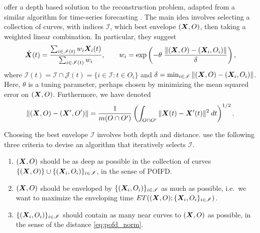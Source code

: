 \textcite{elias-jimenez-shang-2023} offer a depth based solution
to the reconstruction problem, adapted from a similar algorithm for
time-series forecasting \parencite{elias-jimenez-shang-2022}.
The main idea involves selecting a collection of curves, with indices
$\mathscr{I}$, which best envelope $(\bm{X}, O)$, then taking a weighted linear
combination.
In particular, they suggest
\begin{equation}
    \hat{\bm{X}}(t) = \frac{\sum_{i \in \mathscr{I}(t)} w_i \bm{X}_i(t)}{\sum_{i \in \mathscr{I}(t)} w_i}, \qquad
    w_i = \exp\left(-\theta\;\frac{\Vert (\bm{X}, O) - (\bm{X}_i, O_i) \Vert}{\delta}\right),
    \label{eq:pofd_predictor}
\end{equation}
where $\mathscr{I}(t) = \mathscr{I} \cap \mathscr{J}(t) = \{i \in
\mathscr{I}\colon t \in O_i\}$ and $\delta = \min_{i \in \mathscr{I}}
\Vert (\bm{X}, O) - (\bm{X}_i, O_i) \Vert$.
Here, $\theta$ is a tuning parameter, perhaps chosen by minimizing the mean
squared error on $(\bm{X}, O)$.
Furthermore, we have denoted
\begin{equation}
    \Vert (\bm{X}, O) - (\bm{X}', O') \Vert = \frac{1}{m(O \cap O')}\left(\int_{O \cap O'} \Vert \bm{X}(t) - \bm{X}'(t) \Vert^2 \:dt\right)^{1/2}.
    \label{eq:pofd_norm}
\end{equation}

Choosing the best envelope $\mathscr{I}$ involves both depth and distance.
\textcite{elias-jimenez-shang-2023} use the following three criteria to
devise an algorithm that iteratively selects $\mathscr{I}$.
\begin{enumerate}
    \item $(\bm{X}, O)$ should be as deep as possible in the collection of curves
    $\{(\bm{X}, O)\} \cup \{(\bm{X}_i, O_i)\}_{i \in \mathscr{I}}$, in the sense of
    POIFD.

    \item $(\bm{X}, O)$ should be enveloped by $\{(\bm{X}_i, O_i)\}_{i \in
    \mathscr{I}}$ as much as possible, i.e.\ we want to maximize the
    enveloping time $ET((\bm{X}, O); \{\bm{X}_i, O_i\}_{i \in \mathscr{I}})$.

    \item $\{(\bm{X}_i, O_i)\}_{i \in \mathscr{I}}$ should contain as many near
    curves to $(\bm{X}, O)$ as possible, in the sense of the distance
    \ref{eq:pofd_norm}.
\end{enumerate}
